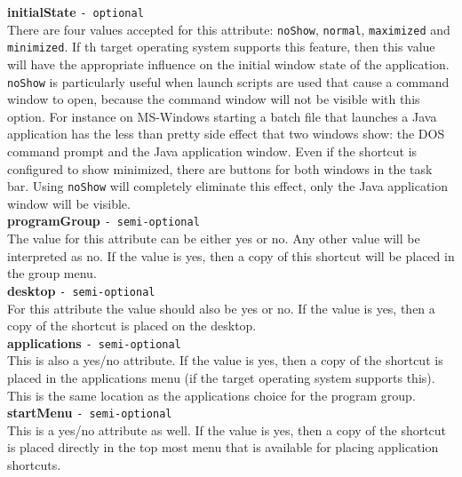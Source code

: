\textbf{initialState} \texttt{- optional}\\

There are four values accepted for this attribute: \texttt{noShow},
\texttt{normal}, \texttt{maximized} and \texttt{minimized}. If th
target operating system supports this feature, then this value will have
the appropriate influence on the initial window state of the
application. \texttt{noShow} is particularly useful when launch scripts
are used that cause a command window to open, because the command window
will not be visible with this option. For instance on MS-Windows
starting a batch file that launches a Java application has the less than
pretty side effect that two windows show: the DOS command prompt and the
Java application window. Even if the shortcut is configured to show
minimized, there are buttons for both windows in the task bar. Using
\texttt{noShow} will completely eliminate this effect, only the Java
application window will be visible.\\

\textbf{programGroup} \texttt{- semi-optional}\\

The value for this attribute can be either yes or no. Any other value
will be interpreted as no. If the value is yes, then a copy of this
shortcut will be placed in the group menu.\\

\textbf{desktop} \texttt{- semi-optional}\\

For this attribute the value should also be yes or no. If the value is
yes, then a copy of the shortcut is placed on the desktop.\\

\textbf{applications} \texttt{- semi-optional}\\

This is also a yes/no attribute. If the value is yes, then a copy of the
shortcut is placed in the applications menu (if the target operating
system supports this). This is the same location as the applications
choice for the program group.\\

\textbf{startMenu} \texttt{- semi-optional}\\

This is a yes/no attribute as well. If the value is yes, then a copy of
the shortcut is placed directly in the top most menu that is available
for placing application shortcuts.\\

